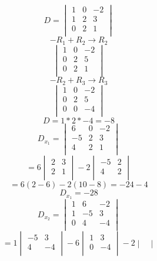 \documentclass[journal]{IEEEtran}
\begin{document}
{			\[
				D = \begin{vmatrix}
					1&	0&	-2	\\
					1&	2&	3	\\
					0&	2&	1	\\
				\end{vmatrix}
			\]
			\[ -R_1 + R_2 \rightarrow R_2 \]
			\[
				\begin{vmatrix}
					1&	0&	-2	\\
					0&	2&	5	\\
					0&	2&	1	\\
				\end{vmatrix}
			\]
			\[ -R_2 + R_3 \rightarrow R_3 \]
			\[
				\begin{vmatrix}
					1&	0&	-2	\\
					0&	2&	5	\\
					0&	0&	-4	\\
				\end{vmatrix}
			\]
			\[ D = 1*2*-4 = -8 \] 
			\[
				D_{x_{1}}=\begin{vmatrix}
					6&	0&	-2	\\
					-5&	2&	3	\\
					4&	2&	1	\\
				\end{vmatrix}
			\]
			\[
				= 6\begin{vmatrix}
					2&	3	\\
					2&	1	\\
				\end{vmatrix}
				-2\begin{vmatrix}
					-5&	2	\\
					4&	2	\\
				\end{vmatrix}
			\]
			\[=6(2-6)-2(10-8)=-24-4\]
			\[D_{x_1}=-28\]
			\[
				D_{x_2} = \begin{vmatrix}
					1&	6&	-2	\\
					1&	-5&	3	\\
					0&	4&	-4	\\
				\end{vmatrix}
			\]
			\[=
				1\begin{vmatrix}
					-5&	3\\
					4&	-4\\
				\end{vmatrix}
				-6\begin{vmatrix}
					1&	3	\\
					0&	-4	\\
				\end{vmatrix}
				-2\begin{vmatrix}

\end{vmatrix}\]}
\end{document}
